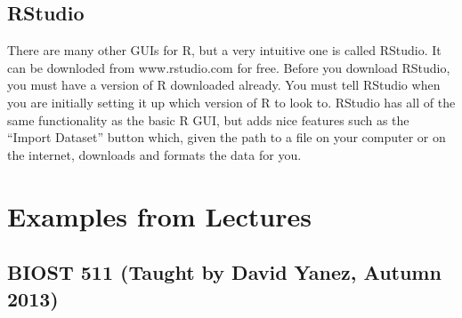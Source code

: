 \documentclass[11pt,letterpaper,fleqn]{report}
\begin{document}
\section{RStudio}
There are many other GUIs for R, but a very intuitive one is called RStudio. It can be downloded from www.rstudio.com for free. Before you download RStudio, you must have a version of R downloaded already. You must tell RStudio when you are initially setting it up which version of R to look to. RStudio has all of the same functionality as the basic R GUI, but adds nice features such as the ``Import Dataset'' button which, given the path to a file on your computer or on the internet, downloads and formats the data for you.
\chapter{Examples from Lectures}
\section{BIOST 511 (Taught by David Yanez, Autumn 2013)}
\end{document}
